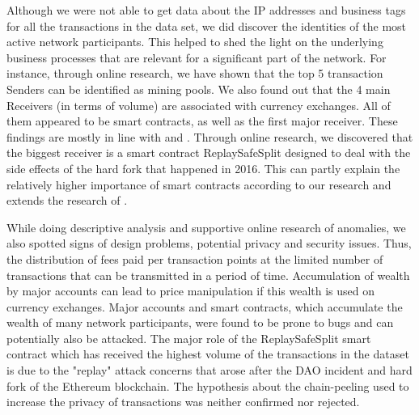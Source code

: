Although we were not able to get data about the IP addresses and business tags for all the transactions in the data set, we did discover the identities of the most active network participants.
This helped to shed the light on the underlying business processes that are relevant for a significant part of the network.
For instance, through online research, we have shown that the top 5 transaction Senders can be identified as mining pools.
We also found out that the 4 main Receivers (in terms of volume) are associated with currency exchanges.
All of them appeared to be smart contracts, as well as the first major receiver. 
These findings are mostly in line with \cite{anoaica2018quantitative} and \cite{chen2018understanding}.
Through online research, we discovered that the biggest receiver is a smart contract ReplaySafeSplit designed to deal with the side effects of the hard fork that happened in 2016. 
This can partly explain the relatively higher importance of smart contracts according to our research and extends the research of \cite{kiffer2017stick}.


While doing descriptive analysis and supportive online research of anomalies, we also spotted signs of design problems, potential privacy and security issues.
Thus, the distribution of fees paid per transaction points at the limited number of transactions that can be transmitted in a period of time.
Accumulation of wealth by major accounts can lead to price manipulation if this wealth is used on currency exchanges.
Major accounts and smart contracts, which accumulate the wealth of many network participants, were found to be prone to bugs and can potentially also be attacked.
The major role of the ReplaySafeSplit smart contract which has received the highest volume of the transactions in the dataset is due to the "replay" attack concerns that arose after the DAO incident and hard fork of the Ethereum blockchain.
The hypothesis about the chain-peeling used to increase the privacy of transactions was neither confirmed nor rejected.




